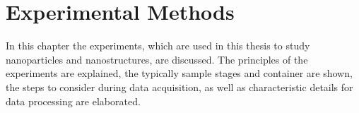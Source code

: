 \documentclass[\main/dresen_thesis.tex]{subfiles}
\renewcommand{\thisPath}{\main/chapters/methods}
\begin{document}
  \chapter{Experimental Methods}\label{ch:methods}
    In this chapter the experiments, which are used in this thesis to study nanoparticles and nanostructures, are discussed.
    The principles of the experiments are explained, the typically sample stages and container are shown, the steps to consider during data acquisition, as well as characteristic details for data processing are elaborated.

    
      \FloatBarrier
    
      \FloatBarrier
    
      \FloatBarrier
    
      \FloatBarrier
    
      \FloatBarrier
    
      \FloatBarrier
    
      \FloatBarrier
    
      \FloatBarrier
\end{document}
